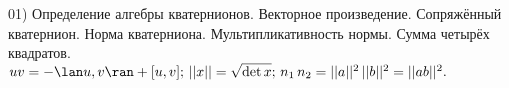 01) Определение алгебры кватернионов. Векторное произведение. Сопряжённый кватернион. Норма кватерниона. Мультипликативность нормы. Сумма четырёх квадратов.\\
$uv = -\lan u, v \ran + [u, v]; \, ||x|| = \sqrt{\det x}; \, n_1 \, n_2 = ||a||^2 \, ||b||^2 = ||a b||^2.$\\
